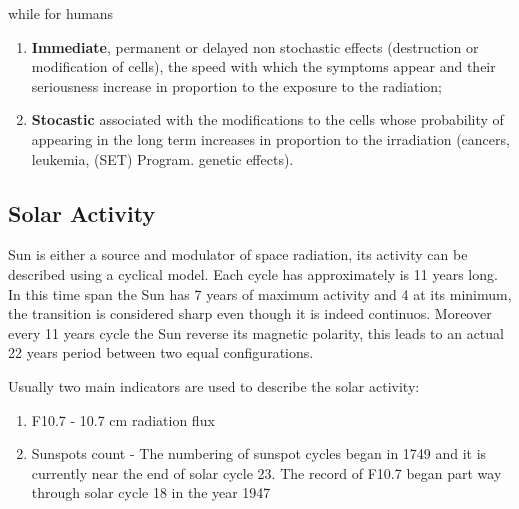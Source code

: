 \documentclass[./dissertation.tex]{subfiles}
\begin{document}
while for humans

\begin{enumerate}
    \item \textbf{Immediate}, permanent or delayed  non  stochastic  effects (destruction or modification of cells), the speed with which the symptoms appear  and  their  seriousness  increase in proportion to the exposure to the radiation;
    \item \textbf {Stocastic}   associated  with the modifications to the cells whose probability of appearing in the long term  increases in proportion to  the irradiation  (cancers,  leukemia, (SET) Program. genetic effects).
\end{enumerate}

\subsection{Solar Activity}
Sun is either a source and modulator of space radiation, its activity can be described using a cyclical model. Each cycle has approximately is 11 years long. In this time span the Sun has 7 years of maximum activity and 4 at its minimum, the transition is considered sharp even though it is indeed continuos. Moreover every 11 years cycle the Sun reverse its magnetic polarity, this leads to an actual 22 years period between two equal configurations.

Usually two main indicators are used to describe the solar activity:
\begin{enumerate}
    \item F10.7 - 10.7 cm radiation flux
    \item Sunspots count - The numbering of sunspot
cycles began in 1749 and it is currently near the end of solar
cycle 23. The record of F10.7 began part way through solar
cycle 18 in the year 1947
\end{enumerate}
\end{document}
